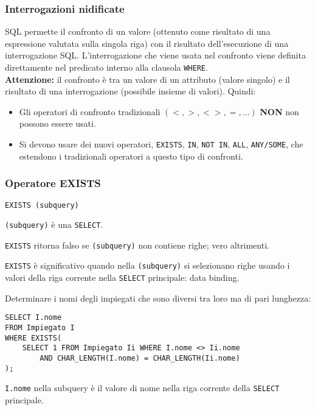 \documentclass[a4paper, 10pt]{article}
\begin{document}
	\subsubsection{Interrogazioni nidificate}
		SQL permette il confronto di un valore (ottenuto come risultato di una
		espressione valutata sulla singola riga) con il risultato dell’esecuzione di
		una interrogazione SQL. L’interrogazione che viene usata nel confronto viene definita
		direttamente nel predicato interno alla clausola \lstinline|WHERE|. \\
		\textbf{Attenzione: }il confronto è tra un valore di un attributo (valore singolo) e
		il risultato di una interrogazione (possibile insieme di valori). Quindi:
		\begin{itemize}
				\item Gli operatori di confronto tradizionali $ (<, >, <>, =, \dots) $ \textbf{NON} non possono	essere usati.
				\item Si devono usare dei nuovi operatori, \lstinline|EXISTS|, \lstinline|IN|, 
				\lstinline|NOT IN|, \lstinline|ALL|, \lstinline|ANY/SOME|, che estendono i tradizionali
				operatori a questo tipo di confronti.
			\end{itemize}
			
	\subsubsection{Operatore EXISTS}
		\begin{lstlisting}
EXISTS (subquery)
		\end{lstlisting}
			\noindent
			\lstinline|(subquery)| è una \lstinline|SELECT|.
			
			\noindent
			\lstinline|EXISTS| ritorna falso se \lstinline|(subquery)| non contiene righe; vero altrimenti.
			
			\noindent
			\lstinline|EXISTS| è significativo quando nella \lstinline|(subquery)| si selezionano righe
			usando i valori della riga corrente nella \lstinline|SELECT| principale: data binding.
			
			\noindent
			Determinare i nomi degli impiegati che sono diversi tra loro ma di pari lunghezza:
			\begin{lstlisting}[tabsize=4]
SELECT I.nome
FROM Impiegato I
WHERE EXISTS(
    SELECT 1 FROM Impiegato Ii WHERE I.nome <> Ii.nome
		AND CHAR_LENGTH(I.nome) = CHAR_LENGTH(Ii.nome)
);
			\end{lstlisting}
			\lstinline|I.nome| nella subquery è il valore di nome nella riga corrente della \lstinline|SELECT| principale.
			
\end{document}
